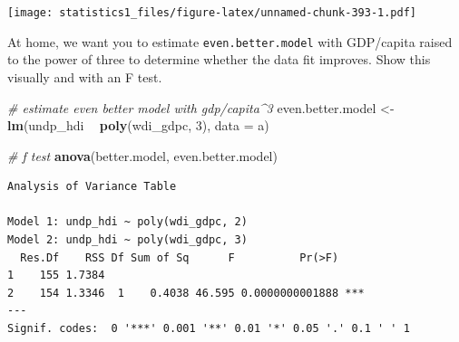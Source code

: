 \documentclass[]{article}
\newenvironment{Shaded}{\begin{snugshade}}{\end{snugshade}}
\newcommand{\KeywordTok}[1]{\textcolor[rgb]{0.13,0.29,0.53}{\textbf{#1}}}
\newcommand{\DataTypeTok}[1]{\textcolor[rgb]{0.13,0.29,0.53}{#1}}
\newcommand{\DecValTok}[1]{\textcolor[rgb]{0.00,0.00,0.81}{#1}}
\newcommand{\StringTok}[1]{\textcolor[rgb]{0.31,0.60,0.02}{#1}}
\newcommand{\CommentTok}[1]{\textcolor[rgb]{0.56,0.35,0.01}{\textit{#1}}}
\newcommand{\OperatorTok}[1]{\textcolor[rgb]{0.81,0.36,0.00}{\textbf{#1}}}
\newcommand{\NormalTok}[1]{#1}
\theoremstyle{definition}
\theoremstyle{definition}
\theoremstyle{definition}
\theoremstyle{remark}
\begin{document}
\texttt{[image: statistics1\_files/figure-latex/unnamed-chunk-393-1.pdf]}

At home, we want you to estimate \texttt{even.better.model} with
GDP/capita raised to the power of three to determine whether the data
fit improves. Show this visually and with an F test.

\begin{Shaded}
\begin{Highlighting}[]
\CommentTok{# estimate even better model with gdp/capita^3}
\NormalTok{even.better.model <-}\StringTok{ }\KeywordTok{lm}\NormalTok{(undp_hdi }\OperatorTok{~}\StringTok{ }\KeywordTok{poly}\NormalTok{(wdi_gdpc, }\DecValTok{3}\NormalTok{), }\DataTypeTok{data =}\NormalTok{ a)}

\CommentTok{# f test}
\KeywordTok{anova}\NormalTok{(better.model, even.better.model)}
\end{Highlighting}
\end{Shaded}

\begin{verbatim}
Analysis of Variance Table

Model 1: undp_hdi ~ poly(wdi_gdpc, 2)
Model 2: undp_hdi ~ poly(wdi_gdpc, 3)
  Res.Df    RSS Df Sum of Sq      F          Pr(>F)    
1    155 1.7384                                        
2    154 1.3346  1    0.4038 46.595 0.0000000001888 ***
---
Signif. codes:  0 '***' 0.001 '**' 0.01 '*' 0.05 '.' 0.1 ' ' 1
\end{verbatim}
\end{document}
